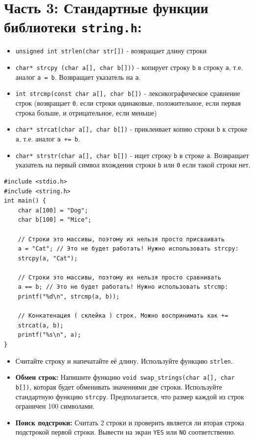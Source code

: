 \documentclass{article}
\begin{document}
\newpage
\section*{Часть 3: Стандартные функции библиотеки \texttt{string.h}:}
\begin{itemize}
\item \texttt{unsigned int strlen(char str[])} - возвращает длину строки
\item \texttt{char* strcpy (char a[], char b[]))} - копирует строку \texttt{b} в строку \texttt{a}, т.е. аналог \texttt{a = b}. Возвращает указатель на \texttt{a}.
\item \texttt{int strcmp(const char a[], char b[])} - лексикографическое сравнение строк (возвращает \texttt{0}, если строки одинаковые, положительное, если первая строка больше, и отрицательное, если меньше)
\item \texttt{char* strcat(char a[], char b[])} - приклеивает копию строки \texttt{b} к строке \texttt{a}, т.е. аналог \texttt{a += b}.
\item \texttt{char* strstr(char a[], char b[])} - ищет строку \texttt{b} в строке \texttt{a}. Возвращает указатель на первый символ вхождения строки \texttt{b} или \texttt{0} если такой строки нет.
\end{itemize}
\begin{lstlisting}
#include <stdio.h>
#include <string.h>
int main() {
	char a[100] = "Dog";
	char b[100] = "Mice";
	
	// Строки это массивы, поэтому их нельзя просто присваивать 
	a = "Cat"; // Это не будет работать! Нужно использовать strcpy:
	strcpy(a, "Cat");
	
	// Строки это массивы, поэтому их нельзя просто сравнивать
	a == b; // Это не будет работать! Нужно использовать strcmp:
	printf("%d\n", strcmp(a, b)); 
	
	// Конкатенация ( склейка ) строк. Можно воспринимать как +=
	strcat(a, b);
	printf("%s\n", a);
}
\end{lstlisting}

\begin{itemize}
\item Считайте строку и напечатайте её длину. Используйте функцию \texttt{strlen}.
\item \textbf{Обмен строк:} Напишите функцию \texttt{void swap\_strings(char a[], char b[])}, которая будет обменивать значениями две строки. Используйте стандартную функцию \texttt{strcpy}. Предполагается, что размер каждой из строк ограничен 100 символами.
\item \textbf{Поиск подстроки:} Считать 2 строки и проверить является ли вторая строка подстрокой первой строки. Вывести на экран \texttt{YES} или \texttt{NO} соответственно.
\end{itemize}
\end{document}
